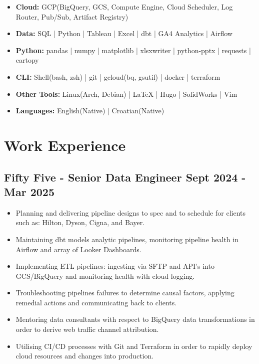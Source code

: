 \documentclass[a4paper, 9pt]{article}
\begin{document}
\begin{itemize}[itemsep=0.0em]
    \item[] \faCloud \hspace{1mm} \textbf{Cloud:} \hspace{8.7mm} GCP(BigQuery, GCS, Compute Engine, Cloud Scheduler, Log Router, Pub/Sub, Artifact Registry)
    \item[] \faBarChart \hspace{1mm} \textbf{Data:} \hspace{10.5mm}  SQL | Python | Tableau | Excel | dbt | 
GA4 Analytics | Airflow
    \item[] \faCog \hspace{1mm} \textbf{Python:} \hspace{7.6mm} pandas | numpy | matplotlib | xlsxwriter | python-pptx | requests | cartopy
    \item[] \faTerminal \hspace{1mm} \textbf{CLI:} \hspace{13.6mm} Shell(bash, zsh) | git |  gcloud(bq, gsutil) | docker | terraform
    \item[] \faWrench \hspace{1mm} \textbf{Other Tools:} \hspace{0.0mm}  Linux(Arch, Debian) |  LaTeX  | Hugo | SolidWorks | Vim
    \item[] \faLanguage \hspace{1mm} \textbf{Languages:} \hspace{1.5mm} English(Native) |  Croatian(Native)
\end{itemize}

\section*{Work Experience}

\subsection*{\textbf{Fifty Five - Senior Data Engineer} \hfill  Sept 2024 - Mar 2025}
\begin{itemize}[noitemsep]
    \item Planning and delivering pipeline designs to spec and to schedule for clients such as: Hilton, Dyson, Cigna, and Bayer.
    \item Maintaining dbt models analytic pipelines, monitoring pipeline health in Airflow and array of Looker Dashboards.
    \item Implementing ETL pipelines: ingesting via SFTP and API's into GCS/BigQuery and monitoring health with cloud logging.
    \item Troubleshooting pipelines failures to determine causal factors, applying remedial actions and communicating back to clients.
    \item Mentoring data consultants with respect to BigQuery data transformations in order to derive web traffic channel attribution.
    \item Utilising CI/CD processes with Git and Terraform in order to rapidly deploy cloud resources and changes into production.
\end{itemize}
\end{document}
